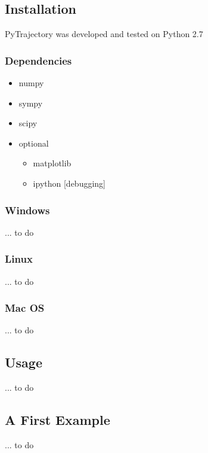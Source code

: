 \documentclass[letterpaper,10pt,english]{sphinxmanual}
\begin{document}
\subsection{Installation}
\label{guide/start:installation}
PyTrajectory was developed and tested on Python 2.7


\subsubsection{Dependencies}
\label{guide/start:dependencies}\begin{itemize}
\item {} 
numpy

\item {} 
sympy

\item {} 
scipy

\item {} 
optional
\begin{itemize}
\item {} 
matplotlib

\item {} 
ipython {[}debugging{]}

\end{itemize}

\end{itemize}


\subsubsection{Windows}
\label{guide/start:windows}
... to do


\subsubsection{Linux}
\label{guide/start:linux}
... to do


\subsubsection{Mac OS}
\label{guide/start:mac-os}
... to do


\subsection{Usage}
\label{guide/start:usage}
... to do


\subsection{A First Example}
\label{guide/start:a-first-example}
... to do
\end{document}
